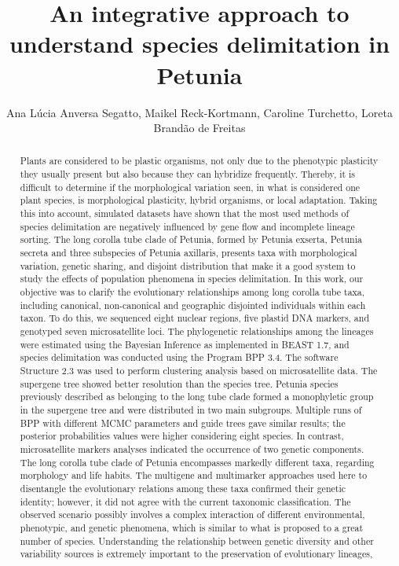 \documentclass[twoside]{article}
\title{\vspace{-15mm}\fontsize{24pt}{10pt}\selectfont\textbf{ An integrative approach to understand species delimitation in Petunia }} %
\author{ Ana L\'ucia Anversa Segatto, Maikel Reck-Kortmann, Caroline Turchetto, Loreta Brand\~ao de Freitas }
\affil{ UNIVERSIDADE FEDERAL DO RIO GRANDE DO SUL }
\date{}
\begin{document}
  
  
  \maketitle %
  
  
  \thispagestyle{fancy} %
  
  
  \begin{abstract}
  Plants are considered to be plastic organisms,  not only due to the phenotypic plasticity they usually present but also because they can hybridize frequently. Thereby,  it is difficult to determine if the morphological variation seen,  in what is considered one plant species,  is morphological plasticity,  hybrid organisms,  or local adaptation. Taking this into account,  simulated datasets have shown that the most used methods of species delimitation are negatively influenced by gene flow and incomplete lineage sorting. The long corolla tube clade of Petunia,  formed by Petunia exserta,  Petunia secreta and three subspecies of Petunia axillaris,  presents taxa with morphological variation,  genetic sharing,  and disjoint distribution that make it a good system to study the effects of population phenomena in species delimitation. In this work,  our objective was to clarify the evolutionary relationships among long corolla tube taxa,  including canonical,  non-canonical and geographic disjointed individuals within each taxon. To do this,  we sequenced eight nuclear regions,  five plastid DNA markers,  and genotyped seven microsatellite loci. The phylogenetic relationships among the lineages were estimated using the Bayesian Inference as implemented in BEAST 1.7,  and species delimitation was conducted using the Program BPP 3.4. The software Structure 2.3 was used to perform clustering analysis based on microsatellite data. The supergene tree showed better resolution than the species tree. Petunia species previously described as belonging to the long tube clade formed a monophyletic group in the supergene tree and were distributed in two main subgroups. Multiple runs of BPP with different MCMC parameters and guide trees gave similar results; the posterior probabilities values were higher considering eight species. In contrast,  microsatellite markers analyses indicated the occurrence of two genetic components. The long corolla tube clade of Petunia encompasses markedly different taxa,  regarding morphology and life habits. The multigene and multimarker approaches used here to disentangle the evolutionary relations among these taxa confirmed their genetic identity; however,  it did not agree with the current taxonomic classification. The observed scenario possibly involves a complex interaction of different environmental,  phenotypic,  and genetic phenomena,  which is similar to what is proposed to a great number of species. Understanding the relationship between genetic diversity and other variability sources is extremely important to the preservation of evolutionary lineages,  
\end{abstract}
\end{document}
